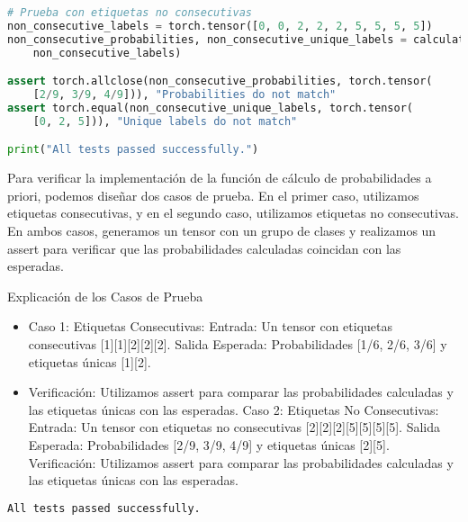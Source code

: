 \documentclass[spanish]{article}
\begin{document}
\begin{enumerate}
\begin{enumerate}
\begin{lstlisting}[language=Python, caption=Pruebas Unitarias Calculo a priori]
# Prueba con etiquetas no consecutivas
non_consecutive_labels = torch.tensor([0, 0, 2, 2, 2, 5, 5, 5, 5])
non_consecutive_probabilities, non_consecutive_unique_labels = calculate_priori_p_t(
    non_consecutive_labels)

assert torch.allclose(non_consecutive_probabilities, torch.tensor(
    [2/9, 3/9, 4/9])), "Probabilities do not match"
assert torch.equal(non_consecutive_unique_labels, torch.tensor(
    [0, 2, 5])), "Unique labels do not match"

print("All tests passed successfully.")
\end{lstlisting}

\vspace{15px}

Para verificar la implementación de la función de cálculo de probabilidades a priori, podemos diseñar dos casos de prueba. En el primer caso, utilizamos etiquetas consecutivas, y en el segundo caso, utilizamos etiquetas no consecutivas. En ambos casos, generamos un tensor con un grupo de clases y realizamos un assert para verificar que las probabilidades calculadas coincidan con las esperadas.

Explicación de los Casos de Prueba

\begin{itemize}
    \item Caso 1: Etiquetas Consecutivas:
Entrada: Un tensor con etiquetas consecutivas [1][1][2][2][2].
Salida Esperada: Probabilidades [1/6, 2/6, 3/6] y etiquetas únicas [1][2].
\item Verificación: Utilizamos assert para comparar las probabilidades calculadas y las etiquetas únicas con las esperadas.
Caso 2: Etiquetas No Consecutivas:
Entrada: Un tensor con etiquetas no consecutivas [2][2][2][5][5][5][5].
Salida Esperada: Probabilidades [2/9, 3/9, 4/9] y etiquetas únicas [2][5].
Verificación: Utilizamos assert para comparar las probabilidades calculadas y las etiquetas únicas con las esperadas.

\end{itemize}

\vspace{15px}



\begin{lstlisting}[language=Python, caption=Salida Pruebas Unitarias Calculo a priori]
All tests passed successfully.
\end{lstlisting}

\newpage


\end{enumerate}
\end{enumerate}
\end{document}
